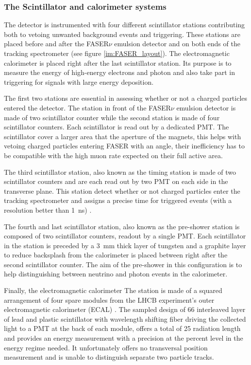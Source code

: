 			 \subsubsection{The Scintillator and calorimeter systems}
			 The detector is instrumented with four different scintillator stations contributing both to vetoing unwanted background events and triggering. These stations are placed before and after the FASER$\nu$ emulsion detector and on both ends of the tracking spectrometer (see figure \ref{im:FASER_layout}). The electromagnetic calorimeter is placed right after the last scintillator station. Its purpose is to measure the energy of high-energy electrons and photon and also take part in triggering for signals with large energy deposition. 
			 
			 The first two stations are essential in assessing whether or not a charged particles entered the detector. The station in front of the FASER$\nu$ emulsion detector is made of two scintillator counter while the second station is made of four scintillator counters. Each scintillator is read out by a dedicated PMT. The scintillator cover a larger area that the aperture of the magnets, this helps with vetoing charged particles entering FASER with an angle, their inefficiency has to be compatible with the high muon rate expected on their full active area. 
			 
			 The third scintillator station, also known as the timing station is made of two scintillator counters and are each read out by two PMT on each side in the transverse plane. This station detect whether or not charged particles enter the tracking spectrometer and assigns a precise time for triggered events (with a resolution better than \SI{1}{\nano\second}) \cite{FASER_Detector}.
			 
			 The fourth and last scintillator station, also known as the pre-shower station is composed of two scintillator counters, readout by a single PMT. Each scintillator in the station is preceded by a \SI{3}{\milli\meter} thick layer of tungsten and a graphite layer to reduce backsplash from the calorimeter is placed between right after the second scintillator counter. The aim of the pre-shower in this configuration is to help distinguishing between neutrino and photon events in the calorimeter. 
			 
			 Finally, the electromagnetic calorimeter  The station is made of a squared arrangement of four spare modules from the LHCB experiment's outer electromagnetic calorimeter (ECAL) \cite{FASER_Detector}. The sampled design of 66 interleaved layer of lead and plastic scintillator with wavelength shifting fiber driving the collected light to a PMT at the back of each module, offers a total of 25 radiation length and provides an energy measurement with a precision at the percent level in the energy regime needed. It unfortunately offers no transversal position measurement and is unable to distinguish separate two particle tracks. 
			 
